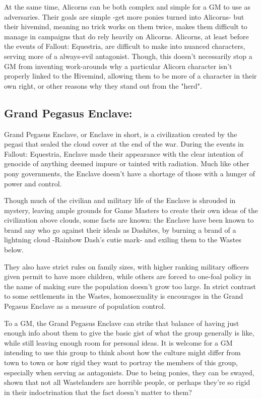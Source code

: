 \documentclass[11pt,a4paper,twocolumn]{book}
\begin{document}
    At the same time, Alicorns can be both complex and simple for a GM to use as adversaries. Their goals are simple -get more ponies turned into Alicorns- but their hivemind, meaning no trick works on them twice, makes them difficult to manage in campaigns that do rely heavily on Alicorns. Alicorns, at least before the events of Fallout: Equestria, are difficult to make into nuanced characters, serving more of a always-evil antagonist. Though, this doesn't necessarily stop a GM from inventing work-arounds why a particular Alicorn character isn't properly linked to the Hivemind, allowing them to be more of a character in their own right, or other reasons why they stand out from the "herd".
    
    \subsection*{Grand Pegasus Enclave:}
    Grand Pegasus Enclave, or Enclave in short, is a civilization created by the pegasi that sealed the cloud cover at the end of the war. During the events in Fallout: Equestria, Enclave made their appearance with the clear intention of genocide of anything deemed impure or tainted with radiation. Much like other pony governments, the Enclave doesn't have a shortage of those with a hunger of power and control.
    
    Though much of the civilian and military life of the Enclave is shrouded in mystery, leaving ample grounds for Game Masters to create their own ideas of the civilization above clouds, some facts are known: the Enclave have been known to brand any who go against their ideals as Dashites, by burning a brand of a lightning cloud -Rainbow Dash's cutie mark- and exiling them to the Wastes below.
    
    They also have strict rules on family sizes, with higher ranking military officers given permit to have more children, while others are forced to one-foal policy in the name of making sure the population doesn't grow too large. In strict contrast to some settlements in the Wastes, homosexuality is encourages in the Grand Pegasus Enclave as a measure of population control.
    
    To a GM, the Grand Pegasus Enclave can strike that balance of having just enough info about them to give the basic gist of what the group generally is like, while still leaving enough room for personal ideas. It is welcome for a GM intending to use this group to think about how the culture might differ from town to town or how rigid they want to portray the members of this group, especially when serving as antagonists. Due to being ponies, they can be swayed, shown that not all Wastelanders are horrible people, or perhaps they're so rigid in their indoctrination that the fact doesn't matter to them?
 
\end{document}
